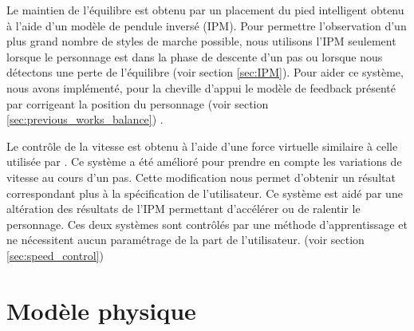 \documentclass[runningheads,a4paper]{llncs}
\begin{document}
Le maintien de l'équilibre est obtenu par un placement du pied intelligent obtenu à l'aide d'un modèle de pendule inversé (IPM). Pour permettre l'observation d'un plus grand nombre de styles de marche possible, nous utilisons l'IPM seulement lorsque le personnage est dans la phase de descente d'un pas ou lorsque nous détectons une perte de l'équilibre (voir section \ref{sec:IPM}). Pour aider ce système, nous avons implémenté, pour  la cheville d'appui le modèle de feedback présenté par \cite{yin2007simbicon} corrigeant la position du personnage (voir section \ref{sec:previous_works_balance}) .

Le contrôle de la vitesse est obtenu à l'aide d'une force virtuelle similaire à celle utilisée par \cite{coros2010generalized}. Ce système a été amélioré pour prendre en compte les variations de vitesse au cours d'un pas. Cette modification nous permet d'obtenir un résultat correspondant plus à la spécification de l'utilisateur. Ce système est aidé par une altération des résultats de l'IPM permettant d'accélérer ou de ralentir le personnage. Ces deux systèmes sont contrôlés par une méthode d'apprentissage et ne nécessitent aucun paramétrage de la part de l'utilisateur. (voir section \ref{sec:speed_control})

%
\section{Modèle physique}
\label{sec:model_physique}
\end{document}
